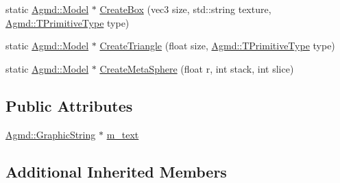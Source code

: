 \begin{DoxyCompactItemize}
\item 
static \hyperlink{class_agmd_1_1_model}{Agmd\+::\+Model} $\ast$ \hyperlink{class_app_a2de7b15768481e2e3d1643b14800430f}{Create\+Box} (vec3 size, std\+::string texture, \hyperlink{namespace_agmd_a0e38d0c34891ddd6eef72e1c9e55161c}{Agmd\+::\+T\+Primitive\+Type} type)
\item 
static \hyperlink{class_agmd_1_1_model}{Agmd\+::\+Model} $\ast$ \hyperlink{class_app_a1692c206194ca4e9d7dd397b4975a9f0}{Create\+Triangle} (float size, \hyperlink{namespace_agmd_a0e38d0c34891ddd6eef72e1c9e55161c}{Agmd\+::\+T\+Primitive\+Type} type)
\item 
static \hyperlink{class_agmd_1_1_model}{Agmd\+::\+Model} $\ast$ \hyperlink{class_app_aba71acabdfa30fddca8daca42973031e}{Create\+Meta\+Sphere} (float r, int stack, int slice)
\end{DoxyCompactItemize}
\subsection*{Public Attributes}
\begin{DoxyCompactItemize}
\item 
\hyperlink{class_agmd_1_1_graphic_string}{Agmd\+::\+Graphic\+String} $\ast$ \hyperlink{class_app_a413558018f1b67c23f0614380c5e6119}{m\+\_\+text}
\end{DoxyCompactItemize}
\subsection*{Additional Inherited Members}


